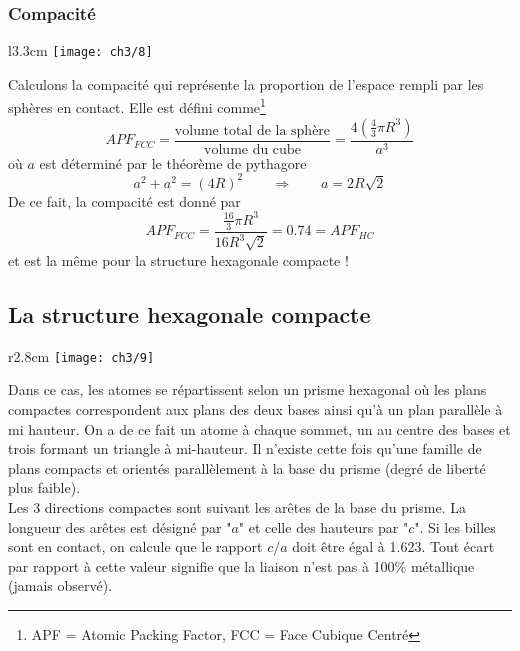 			\subsubsection{Compacité}
			\begin{wrapfigure}[5]{l}{3.3cm}
			\vspace{-5mm}
			\texttt{[image: ch3/8]}
			\end{wrapfigure}
			Calculons la compacité qui représente la proportion de l'espace rempli par les sphères en contact. Elle est défini comme\footnote{APF = Atomic Packing Factor, FCC = Face Cubique Centré}
				\begin{equation}
					APF_{FCC} = \frac{\mbox{volume total de la sphère}}{\mbox{volume du cube}} = \frac{4\left( \frac{4}{3}\pi R^3 \right)}{a^3}					
				\end{equation}					
				où $a$ est déterminé par le théorème de pythagore
				\begin{equation}
					a^2+a^2 = (4R)^2 \qquad \Rightarrow \qquad a = 2R\sqrt{2}
				\end{equation}
				De ce fait, la compacité est donné par 
				\begin{equation}
					APF_{FCC} = \frac{\frac{16}{3}\pi R^3}{16R^3\sqrt{2}} = 0.74 = APF_{HC}
				\end{equation}
				et est la même pour la structure hexagonale compacte !
		\subsection{La structure hexagonale compacte}
			\begin{wrapfigure}[6]{r}{2.8cm}
			\vspace{-5mm}
			\texttt{[image: ch3/9]}
			\end{wrapfigure}
			Dans ce cas, les atomes se répartissent selon un prisme hexagonal où les plans compactes correspondent aux plans des deux bases ainsi qu'à un plan parallèle à mi hauteur. On a de ce fait un atome à chaque sommet, un au centre des bases et trois formant un triangle à mi-hauteur. Il n'existe cette fois qu'une famille de plans compacts et orientés parallèlement à la base du prisme (degré de liberté plus faible). \\
			Les 3 directions compactes sont suivant les arêtes de la base du prisme. La longueur des arêtes est désigné par "$a$" et celle des hauteurs par "$c$". Si les billes sont en contact, on calcule que le rapport $c/a$ doit être égal à 1.623. Tout écart par rapport à cette valeur signifie que la liaison n'est pas à 100\% métallique (jamais observé).
			
